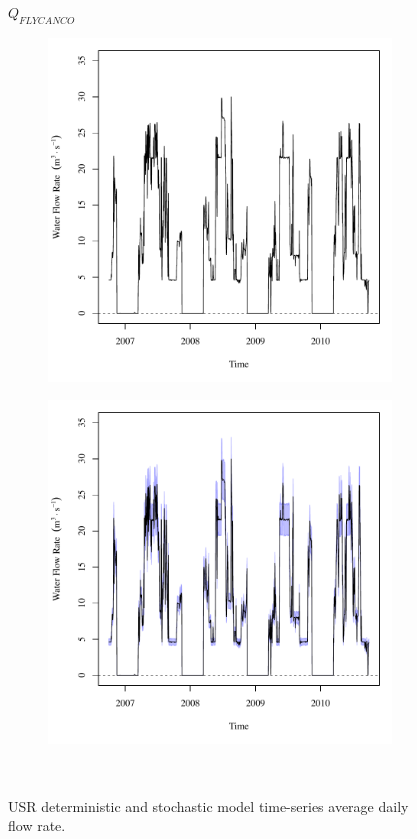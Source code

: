 \subfiguremid
\begin{landscape}
	\begin{figure}
		\centering
		$ Q_{FLYCANCO} $
		\begin{subfigure}{0.7\textwidth}
			\centering
			\includegraphics[width=\tableCustomSize]{"Figures/Results_USR/Deterministic/Q FLY"}
		\end{subfigure}%
		\begin{subfigure}{0.7\textwidth}
			\centering
			\includegraphics[width=\tableCustomSize]{"Figures/Results_USR/Stochastic/Q FLY"}
		\end{subfigure}\\
		\caption{USR deterministic and stochastic model time-series average daily flow rate.}
	\end{figure}
\end{landscape}
